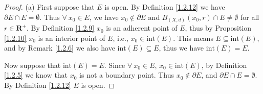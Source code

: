 \begin{proof}{(a)}
    First suppose that \(E\) is open.
    By Definition \ref{1.2.12} we have \(\partial E \cap E = \emptyset\).
    Thus \(\forall\ x_0 \in E\), we have \(x_0 \notin \partial E\) and \(B_{(X, d)}(x_0, r) \cap E \neq \emptyset\) for all \(r \in \mathbf{R}^+\).
    By Definition \ref{1.2.9} \(x_0\) is an adherent point of \(E\), thus by Proposition \ref{1.2.10} \(x_0\) is an interior point of \(E\), i.e., \(x_0 \in \text{int}(E)\).
    This means \(E \subseteq \text{int}(E)\), and by Remark \ref{1.2.6} we also have \(\text{int}(E) \subseteq E\), thus we have \(\text{int}(E) = E\).

    Now suppose that \(\text{int}(E) = E\).
    Since \(\forall\ x_0 \in E\), \(x_0 \in \text{int}(E)\), by Definition \ref{1.2.5} we know that \(x_0\) is not a boundary point.
    Thus \(x_0 \notin \partial E\), and \(\partial E \cap E = \emptyset\).
    By Definition \ref{1.2.12} \(E\) is open.
\end{proof}